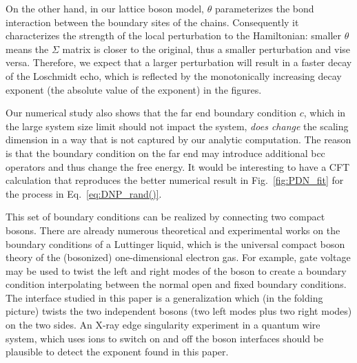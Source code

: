On the other hand, in our lattice boson model, $\theta$ parameterizes the bond interaction between the boundary sites of the chains. Consequently it characterizes the strength of the local perturbation to the Hamiltonian: smaller $\theta$ means the $\Sigma$ matrix is closer to the original, thus a smaller perturbation and vise versa. Therefore, we expect that a larger perturbation will result in a faster decay of the Loschmidt echo, which is reflected by the monotonically increasing decay exponent (the absolute value of the exponent) in the figures.

Our numerical study also shows that the far end boundary condition $c$, which in the large system size limit should not impact the system, {\it does change} the scaling dimension in a way that is not captured by our analytic computation. The reason is that the boundary condition on the far end may introduce additional bcc operators and thus change the free energy. It would be interesting to have a CFT calculation that reproduces the better numerical result in Fig.~\ref{fig:PDN_fit} for the process in Eq.~\eqref{eq:DNP_rand()}. 


This set of boundary conditions can be realized by connecting two compact bosons. There are already numerous theoretical and experimental works on the boundary conditions of a Luttinger liquid\cite{schmeltzer_zero_1999,anfuso_luttinger_2003,voit_bounded_2000,fabrizio_interacting_1995,egger_applying_1998}, which is the universal compact boson theory of the (bosonized) one-dimensional electron gas\cite{giamarchi_quantum_2015}. For example, gate voltage \cite{egger_applying_1998} may be used to twist the left and right modes of the boson to create a boundary condition interpolating between the normal open and fixed boundary conditions. The interface studied in this paper is a generalization which (in the folding picture) twists the two independent bosons (two left modes plus two right modes) on the two sides. An X-ray edge singularity experiment in a quantum wire system, which uses ions to switch on and off the boson interfaces should be plausible to detect the exponent found in this paper. 



